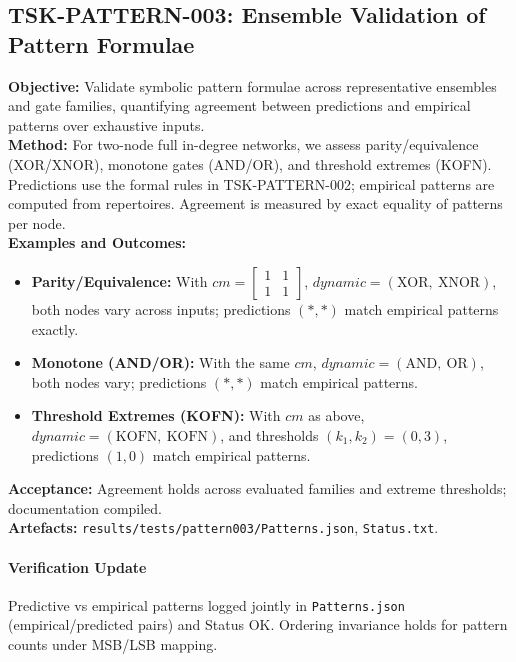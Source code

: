 \documentclass{article}
\begin{document}
\subsection{TSK-PATTERN-003: Ensemble Validation of Pattern Formulae}
\textbf{Objective:} Validate symbolic pattern formulae across representative ensembles and gate families, quantifying agreement between predictions and empirical patterns over exhaustive inputs.\\
\textbf{Method:} For two-node full in-degree networks, we assess parity/equivalence (XOR/XNOR), monotone gates (AND/OR), and threshold extremes (KOFN). Predictions use the formal rules in TSK-PATTERN-002; empirical patterns are computed from repertoires. Agreement is measured by exact equality of patterns per node.\\
\textbf{Examples and Outcomes:}
\begin{itemize}
\item \textbf{Parity/Equivalence:} With \(cm = \begin{bmatrix}1 & 1\\ 1 & 1\end{bmatrix}\), \(dynamic=(\text{XOR},\ \text{XNOR})\), both nodes vary across inputs; predictions \((* , *)\) match empirical patterns exactly.
\item \textbf{Monotone (AND/OR):} With the same \(cm\), \(dynamic=(\text{AND},\ \text{OR})\), both nodes vary; predictions \((* , *)\) match empirical patterns.
\item \textbf{Threshold Extremes (KOFN):} With \(cm\) as above, \(dynamic=(\text{KOFN},\ \text{KOFN})\), and thresholds \((k_1,k_2)=(0,3)\), predictions \((1, 0)\) match empirical patterns.
\end{itemize}
\textbf{Acceptance:} Agreement holds across evaluated families and extreme thresholds; documentation compiled.\\
\textbf{Artefacts:} \texttt{results/tests/pattern003/Patterns.json}, \texttt{Status.txt}.\
\paragraph{Verification Update} Predictive vs empirical patterns logged jointly in \texttt{Patterns.json} (empirical/predicted pairs) and Status OK. Ordering invariance holds for pattern counts under MSB/LSB mapping.
\end{document}

